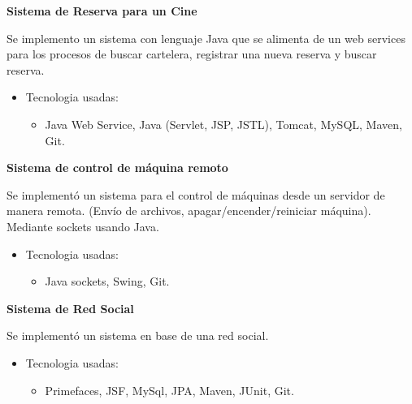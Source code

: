 \documentclass[a4paper,12pt,final]{memoir}
\newcommand{\CVItem}[1]
	{\textbf{\color{RoyalBlue} #1}}
\begin{document}

\CVItem{Sistema de Reserva para un Cine}{
Se implemento un sistema con lenguaje Java que se alimenta de un web services
para los procesos de buscar cartelera, registrar una nueva reserva y buscar reserva.
\begin{itemize}[noitemsep]
  \item Tecnologia usadas:
  \begin{itemize}
    \item Java Web Service, Java (Servlet, JSP, JSTL), Tomcat, MySQL, Maven, Git.
  \end{itemize}
\end{itemize}
}


\CVItem{Sistema de control de máquina remoto}{
Se implementó un sistema para el control de máquinas desde un servidor de manera remota.
(Envío de archivos, apagar/encender/reiniciar máquina). Mediante sockets usando Java.
\begin{itemize}[noitemsep]
  \item Tecnologia usadas:
  \begin{itemize}
    \item Java sockets, Swing, Git.
  \end{itemize}
\end{itemize}
}


\CVItem{Sistema de Red Social}{
Se implementó un sistema en base de una red social.
\begin{itemize}[noitemsep]
  \item Tecnologia usadas:
  \begin{itemize}
    \item Primefaces, JSF, MySql, JPA, Maven, JUnit, Git.
  \end{itemize}
\end{itemize}
}


\clearpage
\end{document}
